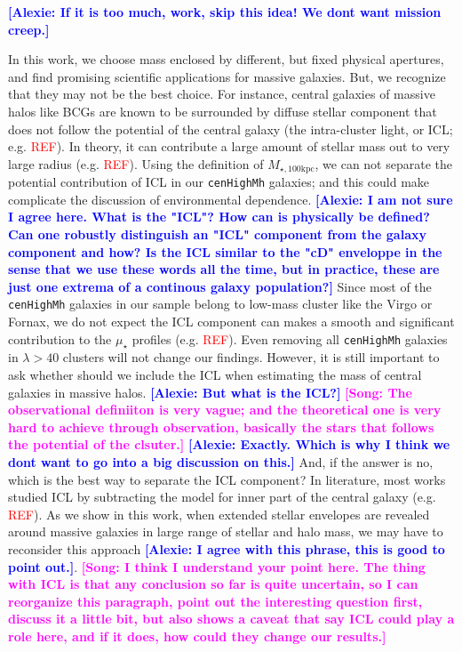 \documentclass{emulateapj}
\def\rbcg{\texttt{cenHighMh}}
\def\mtot{{$M_{\star,100\mathrm{kpc}}$}}
\def\mden{{$\mu_{\star}$}}
\newcommand{\addref}{{\textcolor{red}{REF}}}
\newcommand{\song}[1]{\textcolor{magenta}{\textbf{[Song: #1]}}}
\newcommand{\alexie}[1]{\textcolor{blue}{\textbf{[Alexie: #1]}}}
\begin{document}
\begin{CJK*}{UTF8}{gbsn}
    \alexie{If it is too much, work, skip this idea! We dont want mission creep.}
    
    In this work, we choose mass enclosed by different, but fixed physical 
    apertures, and find promising scientific applications for massive galaxies. 
    But, we recognize that they may not be the best choice. 
    For instance, central galaxies of massive halos like BCGs are known to be
    surrounded by diffuse stellar component that does not follow the potential 
    of the central galaxy (the intra-cluster light, or ICL; e.g. \addref{}).
    In theory, it can contribute a large amount of stellar mass out to very 
    large radius (e.g. \addref{}).  
    Using the definition of \mtot{}, we can not separate the potential 
    contribution of ICL in our \rbcg{} galaxies; and this could make complicate
    the discussion of environmental dependence.  \alexie{I am not sure I agree here. What is the "ICL"? How can is physically be defined? Can one robustly distinguish an "ICL" component from the galaxy component and how? Is the ICL similar to the "cD" enveloppe in the sense that we use these words all the time, but in practice, these are just one extrema of a continous galaxy population?}
    Since most of the \rbcg{} galaxies in our sample belong to low-mass cluster 
    like the Virgo or Fornax, we do not expect the ICL component can makes a 
    smooth and significant contribution to the \mden{} profiles (e.g. \addref{}).
    Even removing all \rbcg{} galaxies in $\lambda > 40$ clusters will not change 
    our findings.  
    However, it is still important to ask whether should we include the ICL when 
    estimating the mass of central galaxies in massive halos.  \alexie{But what is the ICL?}
    \song{The observational definiiton is very vague; and the theoretical one is 
    very hard to achieve through observation, basically the stars that follows the 
    potential of the clsuter.} \alexie{Exactly. Which is why I think we dont want to go into a big discussion on this.}
    And, if the answer is no, which is the best way to separate the ICL component? 
    In literature, most works studied ICL by subtracting the model for inner part
    of the central galaxy (e.g. \addref{}).  
    As we show in this work, when extended stellar envelopes are revealed around 
    massive galaxies in large range of stellar and halo mass, we may have to 
    reconsider this approach \alexie{I agree with this phrase, this is good to point out.}.
    \song{I think I understand your point here. The thing with ICL is that any 
    conclusion so far is quite uncertain, so I can reorganize this paragraph, 
    point out the interesting question first, discuss it a little bit, but also 
    shows a caveat that say ICL could play a role here, and if it does, how could 
    they change our results.}
    

\end{CJK*}
\end{document}
